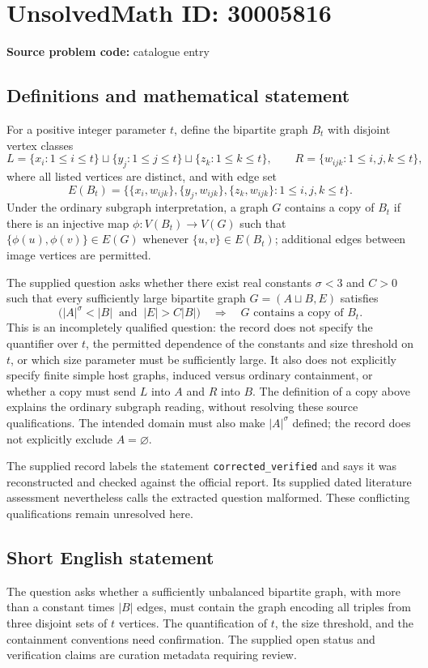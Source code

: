 \documentclass[11pt]{article}
\begin{document}
\section*{UnsolvedMath ID: 30005816}
\textbf{Source problem code:} catalogue entry
\subsection{Definitions and mathematical statement}
For a positive integer parameter \(t\), define the bipartite graph \(B_t\) with disjoint vertex classes
\[
L=\{x_i:1\le i\le t\}\sqcup\{y_j:1\le j\le t\}\sqcup\{z_k:1\le k\le t\},\qquad
R=\{w_{ijk}:1\le i,j,k\le t\},
\]
where all listed vertices are distinct, and with edge set
\[
E(B_t)=\bigl\{\{x_i,w_{ijk}\},\{y_j,w_{ijk}\},\{z_k,w_{ijk}\}:1\le i,j,k\le t\bigr\}.
\]
Under the ordinary subgraph interpretation, a graph \(G\) contains a copy of \(B_t\) if there is an injective map \(\phi:V(B_t)\to V(G)\) such that \(\{\phi(u),\phi(v)\}\in E(G)\) whenever \(\{u,v\}\in E(B_t)\); additional edges between image vertices are permitted.

The supplied question asks whether there exist real constants \(\sigma<3\) and \(C>0\) such that every sufficiently large bipartite graph \(G=(A\sqcup B,E)\) satisfies
\[
\bigl(|A|^\sigma<|B|\ \text{ and }\ |E|>C|B|\bigr)
\quad\Longrightarrow\quad
G\text{ contains a copy of }B_t.
\]
This is an incompletely qualified question: the record does not specify the quantifier over \(t\), the permitted dependence of the constants and size threshold on \(t\), or which size parameter must be sufficiently large. It also does not explicitly specify finite simple host graphs, induced versus ordinary containment, or whether a copy must send \(L\) into \(A\) and \(R\) into \(B\). The definition of a copy above explains the ordinary subgraph reading, without resolving these source qualifications. The intended domain must also make \(|A|^\sigma\) defined; the record does not explicitly exclude \(A=\varnothing\).

The supplied record labels the statement \texttt{corrected\_verified} and says it was reconstructed and checked against the official report. Its supplied dated literature assessment nevertheless calls the extracted question malformed. These conflicting qualifications remain unresolved here.
\subsection{Short English statement}
The question asks whether a sufficiently unbalanced bipartite graph, with more than a constant times \(|B|\) edges, must contain the graph encoding all triples from three disjoint sets of \(t\) vertices. The quantification of \(t\), the size threshold, and the containment conventions need confirmation. The supplied open status and verification claims are curation metadata requiring review.
\end{document}
